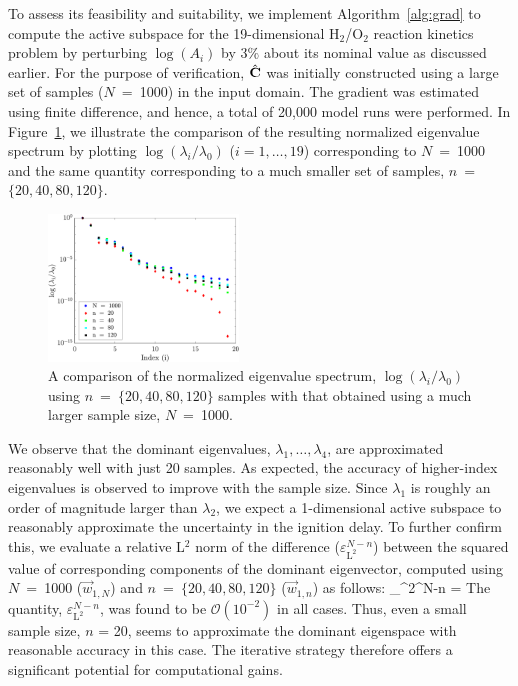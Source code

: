 To assess its feasibility and suitability, we implement
Algorithm~\ref{alg:grad} to compute the active subspace for 
the 19-dimensional H$_2$/O$_2$ reaction kinetics
problem by perturbing $\log(A_i)$ by 3$\%$ about its nominal
value as discussed earlier. For the purpose of verification,
$\hat{\mathbf{{C}}}$ was initially constructed using a large set of samples
($N$~=~1000) in the input domain. The gradient was estimated using
finite difference, and hence, a total of 20,000 model runs were performed. 
In Figure~\ref{fig:eig_comp}, we illustrate the comparison of
the resulting normalized eigenvalue spectrum by plotting $\log(\lambda_i/\lambda_0)$ ($i = 1,\ldots,19$) corresponding to $N$~=~1000 and the same quantity corresponding to
a much smaller set of samples, $n$~=~$\{20,40,80,120\}$.
%
\begin{figure}[htbp]
 \begin{center}
  \includegraphics[width=0.45\textwidth]{eig_comp_p3}
\caption{A comparison of the normalized eigenvalue spectrum, $\log(\lambda_i/\lambda_0)$
using $n$~=~$\{20,40,80,120\}$ samples with that
obtained using a much larger sample size, $N$~=~1000. 
} 
\label{fig:eig_comp}
\end{center}
\end{figure}
%
We observe that the dominant eigenvalues, $\lambda_1, \ldots, \lambda_4$, 
are approximated 
reasonably well with just 20 samples. As expected, the accuracy of higher-index
 eigenvalues is observed
to improve with the sample size. Since 
$\lambda_1$ is roughly an order of magnitude larger than $\lambda_2$, we expect 
a 1-dimensional active subspace to reasonably approximate the uncertainty
in the ignition delay. 
To further confirm this, we evaluate a relative L$^2$ norm of the difference
 ($\varepsilon_{\text{L}^{2}}^{N-n}$) between the 
squared value of corresponding components of the dominant eigenvector, computed using $N$~=~1000 ($\vec{w}_{1,N}$)
and $n$~=~$\{20,40,80,120\}$ ($\vec{w}_{1,n}$) as follows:
%
\be
\varepsilon_{^{2}}^{N-n} = 
\label{eq:accu}
\ee
%
The quantity, $\varepsilon_{\text{L}^{2}}^{N-n}$, was found to be 
$\mathcal{O}(10^{-2})$ in all cases.
Thus, even a small sample size, $n$ = 20, seems to approximate the dominant eigenspace with
reasonable accuracy in this case. 
The iterative strategy therefore offers a significant potential for computational gains. 

